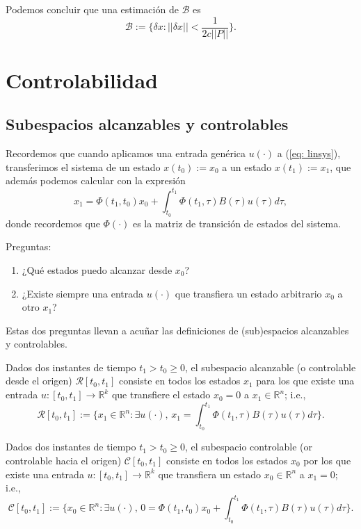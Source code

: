 Podemos concluir que una estimación de $\mathcal B$ es
\begin{equation}
	\mathcal{B} := \{ \delta x : ||\delta x|| < \frac{1}{2c||P||} \}.
	\label{eq: Bregion}
\end{equation}

\section{Controlabilidad}
\subsection{Subespacios alcanzables y controlables}
Recordemos que cuando aplicamos una entrada genérica $u(\cdot)$ a (\ref{eq: linsys}), transferimos el sistema de un estado $x(t_0):=x_0$ a un estado $x(t_1):=x_1$, que además podemos calcular con la expresión
\begin{equation}
	x_1 = \Phi(t_1,t_0)x_0 + \int_{t_0}^{t_1} \Phi(t_1,\tau)B(\tau)u(\tau)d\tau,
\end{equation}
donde recordemos que $\Phi(\cdot)$ es la matriz de transición de estados del sistema.

Preguntas:
\begin{enumerate}
	\item ¿Qué estados puedo alcanzar desde $x_0$?
	\item ¿Existe siempre una entrada $u(\cdot)$ que transfiera un estado arbitrario $x_0$ a otro $x_1$?
\end{enumerate}

Estas dos preguntas llevan a acuñar las definiciones de (sub)espacios alcanzables y controlables.

\begin{definition}
	Dados dos instantes de tiempo $t_1>t_0\geq 0$, el subespacio alcanzable (o controlable desde el origen) $\mathcal{R}[t_0,t_1]$ consiste en todos los estados $x_1$ para los que existe una entrada $u:[t_0,t_1]\to \mathbb{R}^k$ que transfiere el estado $x_0 = 0$ a  $x_1 \in\mathbb{R}^n$; i.e.,
	\begin{equation}
		\mathcal{R}[t_0,t_1] := \Big\{x_1\in\mathbb{R}^n : \exists u(\cdot),\, x_1 = \int_{t_0}^{t_1} \Phi(t_1,\tau)B(\tau)u(\tau)d\tau \Big\}. \label{eq: rs}
	\end{equation}
\end{definition}

\begin{definition}
	Dados dos instantes de tiempo $t_1>t_0\geq 0$, el subespacio controlable (or controlable hacia el origen) $\mathcal{C}[t_0,t_1]$ consiste en todos los estados $x_0$ por los que existe una entrada $u:[t_0,t_1]\to \mathbb{R}^k$ que transfiera un estado $x_0\in\mathbb{R}^n$ a $x_1 = 0$; i.e.,
	\begin{equation}
		\mathcal{C}[t_0,t_1] := \Big\{x_0\in\mathbb{R}^n : \exists u(\cdot),\, 0 = \Phi(t_1,t_0)x_0 + \int_{t_0}^{t_1} \Phi(t_1,\tau)B(\tau)u(\tau)d\tau \Big\}.
	\end{equation}
\end{definition}

